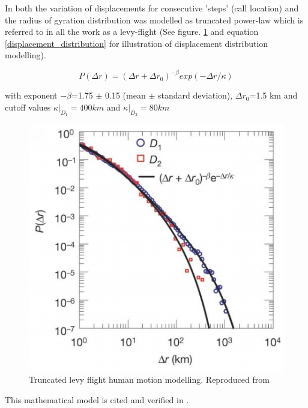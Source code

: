 \documentclass[12pt, a4paper]{report}
\theoremstyle{definition}
\theoremstyle{definition}%
\theoremstyle{definition}%
\theoremstyle{definition}%
\theoremstyle{definition}%
\theoremstyle{definition}%
\begin{document}
In \cite{Gonzalez2008} both the variation of displacements for consecutive 'steps' (call location) and the radius of gyration distribution was modelled as truncated power-law which is referred to in all the work as a levy-flight (See figure. \ref{fig:levy_flight} and equation \ref{displacement_distribution} for illustration of displacement distribution modelling). 

\begin{equation}\label{displacement_distribution}
P(\Delta r) = (\Delta r + \Delta r_{0})^{-\beta}  exp(-\Delta r/\kappa)
\end{equation} 

with exponent $-\beta$=1.75 $\pm$ 0.15 (mean $\pm$ standard deviation), $\Delta r_{0}$=1.5 km and cutoff values $\kappa|_{D_{1}}=400 km$ and $\kappa|_{D_{2}}=80 km$ 

\begin{figure}[h]	
	\includegraphics[scale=0.75]{truncated_power_law}
	\centering
	\caption{Truncated levy flight human motion modelling. Reproduced from \cite{Gonzalez2008}}
	\label{fig:levy_flight}
\end{figure}

This mathematical model is cited and verified in \cite{Calabrese2013}.
\end{document}

